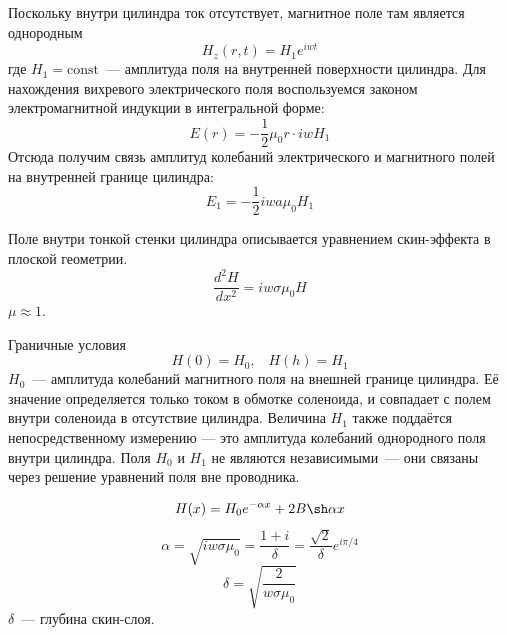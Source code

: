 Поскольку внутри цилиндра ток отсутствует, магнитное поле там является однородным
\[
    H_{z}(r, t) = H_{1}e^{iwt}
\]
где $H_{1}=\text{const}$~--- амплитуда поля на внутренней поверхности цилиндра. Для нахождения вихревого электрического
поля воспользуемся законом электромагнитной индукции  в интегральной форме:
\[
    E(r) = -\frac{1}{2}\mu_{0}r\cdot iwH_{1}
\]
Отсюда получим связь амплитуд колебаний электрического и магнитного полей на внутренней
 границе цилиндра:
 \[
     E_{1} = -\frac{1}{2}iwa\mu_{0}H_{1} 
 \]
\begin{figure}[ht!]
\end{figure}

Поле внутри тонкой стенки цилиндра описывается уравнением скин-эффекта
в плоской геометрии.
\[
    \frac{d^{2}H}{dx^{2}} = iw\sigma\mu_{0}H
\]
$\mu\approx 1$.

Граничные условия
\[
    H(0) = H_{0},\;\;\;H(h)=H_{1}
\]
$H_{0}$~--- амплитуда колебаний магнитного поля на внешней
границе цилиндра. Её значение определяется только током в обмотке соленоида, и совпадает с полем внутри соленоида в отсутствие цилиндра. Величина $H_{1}$
 также поддаётся непосредственному измерению — это амплитуда колебаний однородного поля внутри цилиндра.  Поля $H_{0}$ и $H_{1}$ не являются независимыми~--- они связаны через решение уравнений поля вне проводника.

 \[
     H(x) = H_{0}e^{-\alpha x} + 2B\sh \alpha x
 \]
 \[
 \alpha = \sqrt{iw\sigma\mu_{0}}=\frac{1+i}{\delta} = \frac{\sqrt{2}}{\delta}e^{i\pi/4}
 \]
 \[
     \delta = \sqrt{\frac{2}{w\sigma\mu_{0}}}
 \]
 $\delta$~--- глубина скин-слоя.

